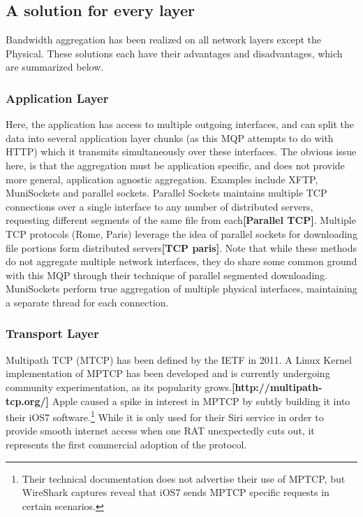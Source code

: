 \documentclass[12pt]{article}
\newcommand{\lcite}[1]
{{\bfseries\color{orange}[#1]}}
\begin{document}
\subsection{A solution for every layer}

	Bandwidth aggregation has been realized on all network layers except the Physical. These solutions each have their advantages and disadvantages, which are summarized below.

	\subsubsection{Application Layer}
		Here, the application has access to multiple outgoing interfaces, and can split the data into several application layer chunks (as this MQP attempts to do with HTTP) which it transmits simultaneously over these interfaces. The obvious issue here, is that the aggregation must be application specific, and does not provide more general, application agnostic aggregation. Examples include XFTP, MuniSockets and parallel sockets. Parallel Sockets maintains multiple TCP connections over a single interface to any number of distributed servers, requesting different segments of the same file from each\lcite{Parallel TCP}. Multiple TCP protocols (Rome, Paris) leverage the idea of parallel sockets for downloading file portions form distributed servers\lcite{TCP paris}. Note that while these methods do not aggregate multiple network interfaces, they do share some common ground with this MQP through their technique of parallel segmented downloading. MuniSockets perform true aggregation of multiple physical interfaces, maintaining a separate thread for each connection. 

	\subsubsection{Transport Layer}
		Multipath TCP (MTCP) has been defined by the IETF in 2011. A Linux Kernel implementation of MPTCP has been developed and is currently undergoing community experimentation, as its popularity grows.\lcite{http://multipath-tcp.org/} Apple caused a spike in interest in MPTCP by subtly building it into their iOS7 software.\footnote{Their technical documentation does not advertise their use of MPTCP, but WireShark captures reveal that iOS7 sends MPTCP specific requests in certain scenarios.} While it is only used for their Siri service in order to provide smooth internet access when one RAT unexpectedly cuts out, it represents the first commercial adoption of the protocol. \\
\end{document}
